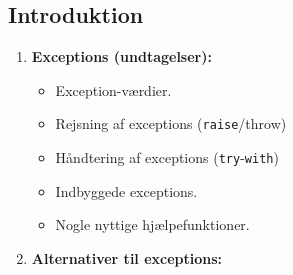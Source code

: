 \documentclass[rgb]{beamer}
\begin{document}
\popmaketitleframe

\renewcommand{\sp}{\vspace{1ex}}
\newcommand{\shead}[1]{\vspace{1ex}\head{#1}\vspace{1ex}}

\subsection{Introduktion}

\begin{frame}[fragile]
\begin{footnotesize}


  \vspace{1ex}

  \begin{minipage}{.65\textwidth}
  \begin{enumerate}
  \item \textbf{Exceptions (undtagelser):}

    \begin{itemize}
    \item Exception-værdier.

    \item Rejsning af exceptions (\lstinline{raise}/throw)

    \item Håndtering af exceptions (\lstinline{try}-\lstinline{with})

    \item Indbyggede exceptions.

    \item Nogle nyttige hjælpefunktioner.
    \end{itemize}

  \item \textbf{Alternativer til exceptions:}


\end{enumerate}
\end{minipage}
\end{footnotesize}
\end{frame}
\end{document}
